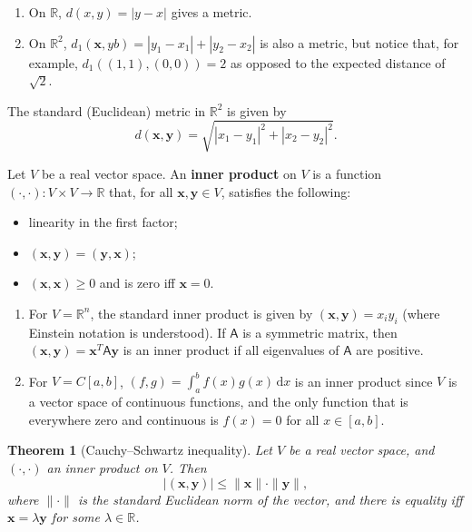 \documentclass[letter-paper]{tufte-book}
\newtheorem{theorem}{\color{pastel-blue}Theorem}[section]
\newenvironment{example}[1][Example]{\begin{trivlist}
\item[\hskip \labelsep {\bfseries #1}]}{\end{trivlist}}
\newcommand{\xb}{\boldsymbol{x}}
\newcommand{\yb}{\boldsymbol{y}}
\begin{document}
\begin{example}
  \begin{enumerate}
    \item On $\mathbb{R}$, $d(x,y) = |y - x|$ gives a metric.
    \item On $\mathbb{R}^2$, $d_1 (\xb, yb) = |y_1 - x_1| + |y_2 - x_2|$ is also a
    metric, but notice that, for example, $d_1( (1, 1), (0, 0) ) = 2$ as opposed
    to the expected distance of $\sqrt{2}$.
  \end{enumerate}
\end{example}

The standard (Euclidean) metric in $\mathbb{R}^2$ is given by
\begin{equation*}
  d(\xb, \yb) = \sqrt{|x_1 - y_1|^2 + |x_2 - y_2|^2}.
\end{equation*}

Let $V$ be a real vector space. An \textbf{inner product} on $V$ is a
function $(\cdot, \cdot) : V\times V\to \mathbb{R}$ that, for all $\xb, \yb\in
V$, satisfies the following:
\begin{itemize}
  \item linearity in the first factor;
  \item $(\xb, \yb) = (\yb, \xb)$;
  \item $(\xb, \xb) \geq 0$ and is zero iff $\xb = 0$.
\end{itemize}
\begin{example}
  \begin{enumerate}
    \item For $V = \mathbb{R}^n$, the standard inner product is given by $(\xb,
    \yb) = x_i y_i$ (where Einstein notation is understood). If
    $\boldsymbol{\mathsf{A}}$ is a symmetric matrix, then $(\xb, \yb) = \xb^T
    \boldsymbol{\mathsf{A}} \yb$ is an inner product if all eigenvalues of
    $\boldsymbol{\mathsf{A}}$ are positive.
    
    \item For $V = C[a, b]$, $(f, g) = \int_a^b f(x) g(x)\, \mathrm{d}x$ is an
    inner product since $V$ is a vector space of continuous functions, and the
    only function that is everywhere zero and continuous is $f(x) = 0$ for all
    $x\in[a, b]$.
  \end{enumerate}
\end{example}

\begin{theorem}[Cauchy--Schwartz inequality]
  Let $V$ be a real vector space, and $(\cdot, \cdot)$ an inner product on $V$.
  Then
  \begin{equation*}
    \left|(\xb, \yb)\right| \leq \|\xb\| \cdot \|\yb\|,
  \end{equation*}
  where $\|\cdot\|$ is the standard Euclidean norm of the vector, and there is
  equality iff $\xb = \lambda \yb$ for some $\lambda \in \mathbb{R}$.
\end{theorem}
\end{document}
